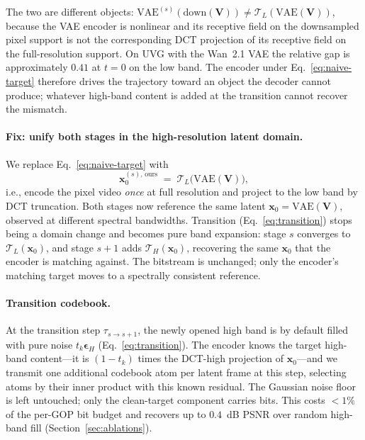 The two are different objects:
$\mathrm{VAE}^{(s)}(\mathrm{down}(\mathbf{V})) \neq \mathcal{T}_L(\mathrm{VAE}(\mathbf{V}))$,
because the VAE encoder is nonlinear and its receptive field on the
downsampled pixel support is not the corresponding DCT projection of its
receptive field on the full-resolution support. On UVG with the Wan~2.1
VAE the relative gap is approximately $0.41$ at $t\!=\!0$ on the low
band. The encoder under Eq.~\ref{eq:naive-target} therefore drives the
trajectory toward an object the decoder cannot produce; whatever
high-band content is added at the transition cannot recover the
mismatch.

\paragraph{Fix: unify both stages in the high-resolution latent domain.}
We replace Eq.~\ref{eq:naive-target} with
\begin{equation}
\mathbf{x}_0^{(s),\,\text{ours}} \;=\; \mathcal{T}_L\bigl(\mathrm{VAE}(\mathbf{V})\bigr),
\label{eq:lp-target}
\end{equation}
i.e., encode the pixel video \emph{once} at full resolution and project to
the low band by DCT truncation. Both stages now reference the same latent
$\mathbf{x}_0 \!=\! \mathrm{VAE}(\mathbf{V})$, observed at different spectral
bandwidths. Transition (Eq.~\ref{eq:transition}) stops being a domain
change and becomes pure band expansion: stage $s$ converges to
$\mathcal{T}_L(\mathbf{x}_0)$, and stage $s\!+\!1$ adds
$\mathcal{T}_H(\mathbf{x}_0)$, recovering the same $\mathbf{x}_0$ that the
encoder is matching against. The bitstream is unchanged; only the
encoder's matching target moves to a spectrally consistent reference.

\paragraph{Transition codebook.}
At the transition step $\tau_{s\to s+1}$, the newly opened high band is
by default filled with pure noise $t_k\boldsymbol{\epsilon}_H$
(Eq.~\ref{eq:transition}). The encoder knows the target high-band
content---it is $(1-t_k)$ times the DCT-high projection of
$\mathbf{x}_0$---and we transmit one additional codebook atom per latent
frame at this step, selecting atoms by their inner product with this
known residual. The Gaussian noise floor is left untouched; only the
clean-target component carries bits. This costs $<1\%$ of the per-GOP
bit budget and recovers up to $0.4$~dB PSNR over random high-band fill
(Section~\ref{sec:ablations}).

